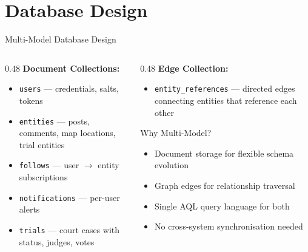 \documentclass[aspectratio=169,11pt]{beamer}
\begin{document}
\section{Database Design}

\begin{frame}{Multi-Model Database Design}
  \begin{columns}[T]
    \begin{column}{0.48\textwidth}
      \textbf{Document Collections:}
      \begin{itemize}
        \item \texttt{users} --- credentials, salts, tokens
        \item \texttt{entities} --- posts, comments, map locations, trial entities
        \item \texttt{follows} --- user $\rightarrow$ entity subscriptions
        \item \texttt{notifications} --- per-user alerts
        \item \texttt{trials} --- court cases with status, judges, votes
      \end{itemize}
    \end{column}
    \begin{column}{0.48\textwidth}
      \textbf{Edge Collection:}
      \begin{itemize}
        \item \texttt{entity\_references} --- directed edges
              connecting entities that reference each other
      \end{itemize}
      \vspace{0.5em}
      \begin{block}{Why Multi-Model?}
        \begin{itemize}
          \item Document storage for flexible schema evolution
          \item Graph edges for relationship traversal
          \item Single AQL query language for both
          \item No cross-system synchronisation needed
        \end{itemize}
      \end{block}
    \end{column}
  \end{columns}
\end{frame}
\end{document}
